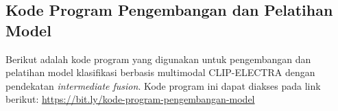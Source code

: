 \subsection{Kode Program Pengembangan dan Pelatihan Model}
Berikut adalah kode program yang digunakan untuk pengembangan dan pelatihan model klasifikasi berbasis multimodal CLIP-ELECTRA dengan pendekatan \textit{intermediate fusion}. Kode program ini dapat diakses pada link berikut: \href{https://bit.ly/kode-program-pengembangan-model}{https://bit.ly/kode-program-pengembangan-model}

